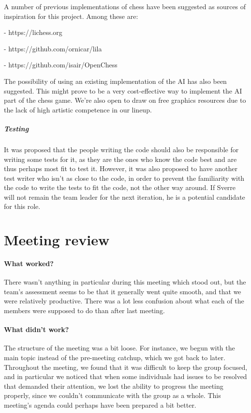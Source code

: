 \documentclass{article}
\begin{document}
A number of previous implementations of chess have been suggested as sources of inspiration for this project. Among these are:

- https://lichess.org

- https://github.com/ornicar/lila

- https://github.com/isair/OpenChess \newline

\noindent
The possibility of using an existing implementation of the AI has also been suggested. This might prove to be a very cost-effective way to implement the AI part of the chess game. We're also open to draw on free graphics resources due to the lack of high artistic competence in our lineup.

\subparagraph{Testing}

It was proposed that the people writing the code should also be responsible for writing some tests for it, as they are the ones who know the code best and are thus perhaps most fit to test it. However, it was also proposed to have another test writer who isn't as close to the code, in order to prevent the familiarity with the code to write the tests to fit the code, not the other way around. If Sverre will not remain the team leader for the next iteration, he is a potential candidate for this role.

\section{Meeting review}

\paragraph{What worked?}

There wasn't anything in particular during this meeting which stood out, but the team's assessment seems to be that it generally went quite smooth, and that we were relatively productive. There was a lot less confusion about what each of the members were supposed to do than after last meeting.

\paragraph{What didn't work?}

The structure of the meeting was a bit loose. For instance, we begun with the main topic instead of the pre-meeting catchup, which we got back to later. Throughout the meeting, we found that it was difficult to keep the group focused, and in particular we noticed that when some individuals had issues to be resolved that demanded their attention, we lost the ability to progress the meeting properly, since we couldn't communicate with the group as a whole. This meeting's agenda could perhaps have been prepared a bit better.
\end{document}
